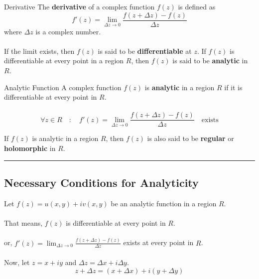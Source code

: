 \begin{definition}{Derivative}{}
    The \textbf{derivative} of a complex function $f(z)$ is defined as
    \[
        f'(z) = \lim_{\Delta z \to 0} \frac{f(z + \Delta z) - f(z)}{\Delta z}
    \]
    where $\Delta z$ is a complex number. \\~\\
    
    If the limit exists, then $f(z)$ is said to be \textbf{differentiable} at $z$. If $f(z)$ is differentiable at every point in a region $R$, then $f(z)$ is said to be \textbf{analytic} in $R$.
\end{definition}

\begin{definition}{Analytic Function}{}
    A complex function $f(z)$ is \textbf{analytic} in a region $R$ if it is differentiable at every point in $R$. \\~\\
    \[
        \forall z \in R \quad : \quad f'(z) = \lim_{\Delta z \to 0} \frac{f(z + \Delta z) - f(z)}{\Delta z} \quad \text{exists}
    \] 
    
    If $f(z)$ is analytic in a region $R$, then $f(z)$ is also said to be \textbf{regular} or \textbf{holomorphic} in $R$.
\end{definition}

\vspace{20pt}\rule{3in}{1pt}


\subsection{Necessary Conditions for Analyticity}
Let $f(z) = u(x,y) + iv(x,y)$ be an analytic function in a region $R$. \\~\\

That means, $f(z)$ is differentiable at every point in $R$. \\~\\

or, $\displaystyle f'(z) = \lim_{\Delta z \to 0} \frac{f(z + \Delta z) - f(z)}{\Delta z}$ exists at every point in $R$. \\~\\

Now, let $z = x+iy$ and $\Delta z = \Delta x + i\Delta y$.
\[ z + \Delta z = (x + \Delta x) + i(y + \Delta y) \]

